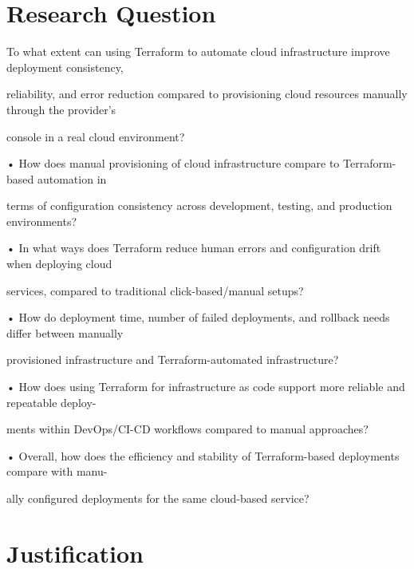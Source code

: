 \documentclass[10pt]{article}
\begin{document}

\section{Research Question}  

To what extent can using Terraform to automate cloud infrastructure improve deployment consistency,

reliability, and error reduction compared to provisioning cloud resources manually through the provider’s

console in a real cloud environment?

• How does manual provisioning of cloud infrastructure compare to Terraform-based automation in

terms of configuration consistency across development, testing, and production environments?

• In what ways does Terraform reduce human errors and configuration drift when deploying cloud

services, compared to traditional click-based/manual setups?

• How do deployment time, number of failed deployments, and rollback needs differ between manually

provisioned infrastructure and Terraform-automated infrastructure?

• How does using Terraform for infrastructure as code support more reliable and repeatable deploy-

ments within DevOps/CI-CD workflows compared to manual approaches?

• Overall, how does the efficiency and stability of Terraform-based deployments compare with manu-

ally configured deployments for the same cloud-based service?


\section{Justification} 
\end{document}
